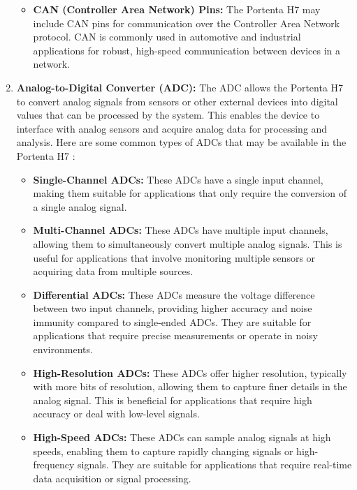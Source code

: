 \begin{enumerate}
\begin{itemize}
		\item \textbf{CAN (Controller Area Network) Pins:} The Portenta H7 may include CAN pins for communication over the Controller Area Network protocol. CAN is commonly used in automotive and industrial applications for robust, high-speed communication between devices in a network.
		
	\end{itemize}
	
	
	
	\item \textbf{Analog-to-Digital Converter (ADC):} The ADC allows the Portenta H7 to convert analog signals from sensors or other external devices into digital values that can be processed by the system. This enables the device to interface with analog sensors and acquire analog data for processing and analysis. Here are some common types of ADCs that may be available in the Portenta H7 \cite{arduinoABX00042:2024} :
	
	\begin{itemize}
		
		\item \textbf{Single-Channel ADCs:} These ADCs have a single input channel, making them suitable for applications that only require the conversion of a single analog signal.
		
		\item \textbf{Multi-Channel ADCs:} These ADCs have multiple input channels, allowing them to simultaneously convert multiple analog signals. This is useful for applications that involve monitoring multiple sensors or acquiring data from multiple sources.
		
		\item \textbf{Differential ADCs:} These ADCs measure the voltage difference between two input channels, providing higher accuracy and noise immunity compared to single-ended ADCs. They are suitable for applications that require precise measurements or operate in noisy environments.
		
		\item \textbf{High-Resolution ADCs:} These ADCs offer higher resolution, typically with more bits of resolution, allowing them to capture finer details in the analog signal. This is beneficial for applications that require high accuracy or deal with low-level signals.
		
		\item \textbf{High-Speed ADCs:} These ADCs can sample analog signals at high speeds, enabling them to capture rapidly changing signals or high-frequency signals. They are suitable for applications that require real-time data acquisition or signal processing.
		

\end{itemize}
\end{enumerate}
